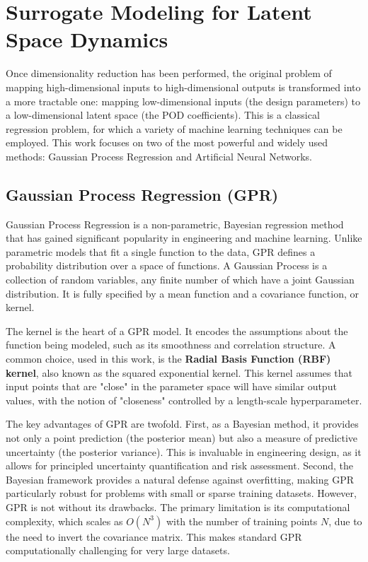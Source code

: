 \documentclass[dscexam, EN]{ufabcFHZh}
\begin{document}
\section{Surrogate Modeling for Latent Space Dynamics}

Once dimensionality reduction has been performed, the original problem of mapping high-dimensional inputs to high-dimensional outputs is transformed into a more tractable one: mapping low-dimensional inputs (the design parameters) to a low-dimensional latent space (the POD coefficients). This is a classical regression problem, for which a variety of machine learning techniques can be employed. This work focuses on two of the most powerful and widely used methods: Gaussian Process Regression and Artificial Neural Networks.

\subsection{Gaussian Process Regression (GPR)}

Gaussian Process Regression is a non-parametric, Bayesian regression method that has gained significant popularity in engineering and machine learning. Unlike parametric models that fit a single function to the data, GPR defines a probability distribution over a space of functions. A Gaussian Process is a collection of random variables, any finite number of which have a joint Gaussian distribution. It is fully specified by a mean function and a covariance function, or kernel.

The kernel is the heart of a GPR model. It encodes the assumptions about the function being modeled, such as its smoothness and correlation structure. A common choice, used in this work, is the \textbf{Radial Basis Function (RBF) kernel}, also known as the squared exponential kernel. This kernel assumes that input points that are "close" in the parameter space will have similar output values, with the notion of "closeness" controlled by a length-scale hyperparameter.

The key advantages of GPR are twofold. First, as a Bayesian method, it provides not only a point prediction (the posterior mean) but also a measure of predictive uncertainty (the posterior variance). This is invaluable in engineering design, as it allows for principled uncertainty quantification and risk assessment. Second, the Bayesian framework provides a natural defense against overfitting, making GPR particularly robust for problems with small or sparse training datasets. However, GPR is not without its drawbacks. The primary limitation is its computational complexity, which scales as $O(N^3)$ with the number of training points $N$, due to the need to invert the covariance matrix. This makes standard GPR computationally challenging for very large datasets.
\end{document}
